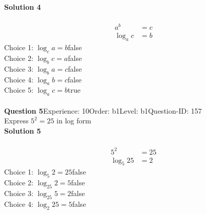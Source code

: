 \documentclass{article}
\begin{document}
\noindent\textbf{Solution 4}\\[2pt]
\\[-35pt]\begin{align*}
a^b&=c\\[2pt]
\log_ac&=b
\end{align*}
Choice 1: \hspace{20pt}$\log_ca=b$\hspace{20pt}false\\
Choice 2: \hspace{20pt}$\log_bc=a$\hspace{20pt}false\\
Choice 3: \hspace{20pt}$\log_ba=c$\hspace{20pt}false\\
Choice 4: \hspace{20pt}$\log_ab=c$\hspace{20pt}false\\
Choice 5: \hspace{20pt}$\log_ac=b$\hspace{20pt}true\\
\\[4pt]
\noindent\textbf{Question 5}\hspace{20pt}Experience: 10\hspace{20pt}Order: b1\hspace{20pt}Level: b1\hspace{20pt}Question-ID: 157\\[2pt]
Express $5^2=25$ in log form\\[4pt]
\noindent\textbf{Solution 5}\\[2pt]
\\[-35pt]\begin{align*}
5^2&=25\\[2pt]
\log_{5}25&=2
\end{align*}
Choice 1: \hspace{20pt}$\log_{5}2=25$\hspace{20pt}false\\
Choice 2: \hspace{20pt}$\log_{25}2=5$\hspace{20pt}false\\
Choice 3: \hspace{20pt}$\log_{25}5=2$\hspace{20pt}false\\
Choice 4: \hspace{20pt}$\log_{2}25=5$\hspace{20pt}false\\
\end{document}
